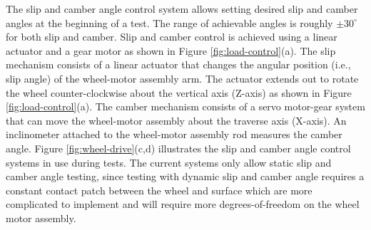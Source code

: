 \documentclass{article}
\begin{document}
The slip and camber angle control system allows setting desired slip and camber angles at the beginning of a test. The range of achievable angles is roughly $\pm 30^\circ$ for both slip and camber. Slip and camber control is achieved using a linear actuator and a gear motor as shown in Figure \ref{fig:load-control}(a). The slip mechanism consists of a linear actuator that changes the angular position (i.e., slip angle) of the wheel-motor assembly arm.  The actuator extends out to rotate the wheel counter-clockwise about the vertical axis (Z-axis) as shown in Figure \ref{fig:load-control}(a). %
The camber mechanism consists of a servo motor-gear system that can move the wheel-motor assembly about the traverse axis (X-axis). %
An inclinometer attached to the wheel-motor assembly rod measures the camber angle. %
Figure \ref{fig:wheel-drive}(c,d) illustrates the slip and camber angle control systems in use during tests. The current systems only allow static slip and camber angle testing, since testing with dynamic slip and camber angle requires a constant contact patch between the wheel and surface which are more complicated to implement and will require more degrees-of-freedom on the wheel motor assembly.



\end{document}
